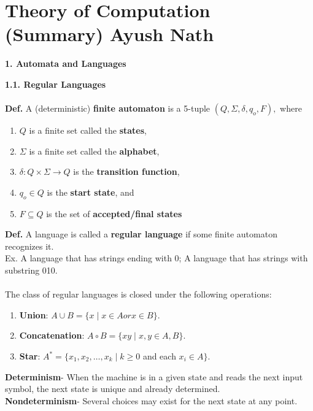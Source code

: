 \documentclass[12pt]{article}
\begin{document}
\section{Theory of Computation (Summary) \hfill Ayush Nath}
\bigskip
\large
\textbf{1. Automata and Languages}
\small
\begin{multicols}{2}
\textbf{1.1. Regular Languages}\\\vspace{-3mm}
\\
\textbf{Def.} A (deterministic) \textbf{finite automaton} is a 5-tuple $(Q, \Sigma, \delta, q_{o}, F),$ where\vspace{-3mm}
\begin{enumerate}
\itemsep-0.5em
\item $Q$ is a finite set called the \textbf{states},
\item $\Sigma$ is a finite set called the \textbf{alphabet},
\item $\delta: Q \times \Sigma \rightarrow Q$ is the \textbf{transition function},
\item $q_{o} \in Q$ is the \textbf{start state}, and
\item $F \subseteq Q$ is the set of \textbf{accepted/final states}
\end{enumerate}\vspace{-2mm}
\textbf{Def.} A language is called a \textbf{regular language} if some finite automaton recognizes it.\\
Ex. A language that has strings ending with 0; A language that has strings with substring 010.\\\vspace{-3mm}
\\
The class of regular languages is closed under the following operations:
\begin{enumerate}
\itemsep-0.5em
\item \textbf{Union}: $A \cup B = \lbrace x \mid x \in A or x \in B \rbrace.$
\item \textbf{Concatenation}: $A \circ B = \lbrace xy \mid x,y \in A,B \rbrace.$
\item \textbf{Star}: $A^{*} = \lbrace x_{1}, x_{2}, \dots, x_{k} \mid k \geq 0 $ and each $ x_{i} \in A \rbrace.$
\end{enumerate}
\textbf{Determinism}- When the machine is in a given state and reads the next input symbol, the next state is unique and already determined.\\
\textbf{Nondeterminism}- Several choices may exist for the next state at any point.\\

\end{multicols}
\end{document}
